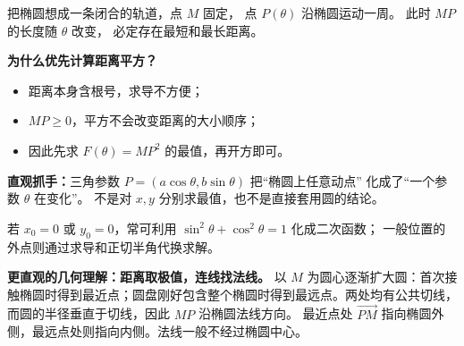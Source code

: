 \begin{explanationbox}
把椭圆想成一条闭合的轨道，点 $M$ 固定，
点 $P(\theta)$ 沿椭圆运动一周。
此时 $MP$ 的长度随 $\theta$ 改变，
必定存在最短和最长距离。

\textbf{为什么优先计算距离平方？}
\begin{itemize}
  \item 距离本身含根号，求导不方便；
  \item $MP\ge0$，平方不会改变距离的大小顺序；
  \item 因此先求 $F(\theta)=MP^2$ 的最值，再开方即可。
\end{itemize}

\textbf{直观抓手：}三角参数
$P=(a\cos\theta,b\sin\theta)$ 把“椭圆上任意动点”
化成了“一个参数 $\theta$ 在变化”。
不是对 $x,y$ 分别求最值，也不是直接套用圆的结论。

若 $x_0=0$ 或 $y_0=0$，常可利用
$\sin^2\theta+\cos^2\theta=1$
化成二次函数；
一般位置的外点则通过求导和正切半角代换求解。

\medskip\textbf{更直观的几何理解：距离取极值，连线找法线。}
以 $M$ 为圆心逐渐扩大圆：首次接触椭圆时得到最近点；圆盘刚好包含整个椭圆时得到最远点。两处均有公共切线，而圆的半径垂直于切线，因此 $MP$ 沿椭圆法线方向。
最近点处 $\overrightarrow{PM}$ 指向椭圆外侧，最远点处则指向内侧。法线一般不经过椭圆中心。


\end{explanationbox}
